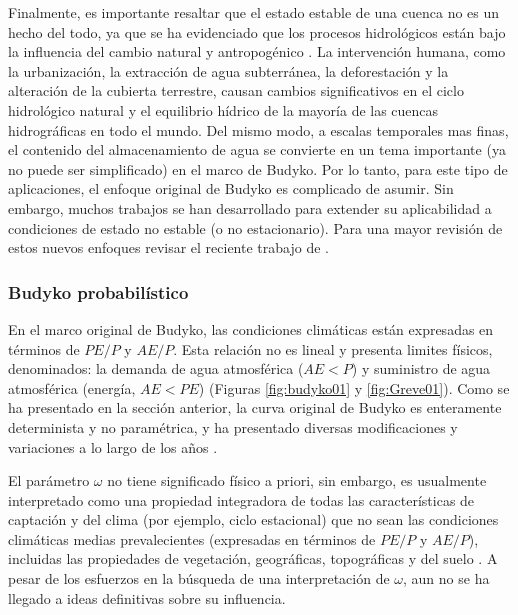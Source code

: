 \documentclass[12pt]{article}
\begin{document}
Finalmente, es importante resaltar que el estado estable de una cuenca no es un hecho del todo, ya que se ha evidenciado que los procesos hidrológicos están bajo la influencia del cambio natural y antropogénico \citep{greve2016two,moussa2016budyko,fathi2019new}. La intervención humana, como la urbanización, la extracción de agua subterránea, la deforestación y la alteración de la cubierta terrestre, causan cambios significativos en el ciclo hidrológico natural y el equilibrio hídrico de la mayoría de las cuencas hidrográficas en todo el mundo. Del mismo modo, a escalas temporales mas finas, el contenido del almacenamiento de agua se convierte en un tema importante (ya no puede ser simplificado) en el marco de Budyko. Por lo tanto, para este tipo de aplicaciones, el enfoque original de Budyko es complicado de asumir. Sin embargo, muchos trabajos se han desarrollado para extender su aplicabilidad a condiciones de estado no estable (o no estacionario). Para una mayor revisión de estos nuevos enfoques revisar el reciente trabajo de \citet{mianabadi2020budyko}.

\subsubsection{Budyko probabilístico}

En el marco original de Budyko, las condiciones climáticas están expresadas en términos de $PE/P$ y $AE/P$. Esta relación no es lineal y presenta limites físicos, denominados: la demanda de agua atmosférica ($AE < P$) y suministro de agua atmosférica (energía, $AE < PE$) (Figuras \ref{fig:budyko01} y \ref{fig:Greve01}). Como se ha presentado en la sección anterior, la curva original de Budyko es enteramente determinista y no paramétrica, y ha presentado diversas modificaciones y variaciones a lo largo de los años \citep{Budyko1961,Fu1981,Koster1999,Wang2014,Zhang2004,Zhang2008,fathi2019new}. 

El parámetro $\omega$ \citep[Ecuación \ref{equ:fuEqu}]{Fu1981} no tiene significado físico a priori, sin embargo, es usualmente interpretado como una propiedad integradora de todas las características de captación y del clima (por ejemplo, ciclo estacional) que no sean las condiciones climáticas medias prevalecientes (expresadas en términos de $PE/P$ y $AE/P$), incluidas las propiedades de vegetación, geográficas, topográficas y del suelo \citep{Gentine2012,Berghuijs2014,Greve2015}. A pesar de los esfuerzos en la búsqueda de una interpretación de $\omega$, aun no se ha llegado a ideas definitivas sobre su influencia.
\end{document}
